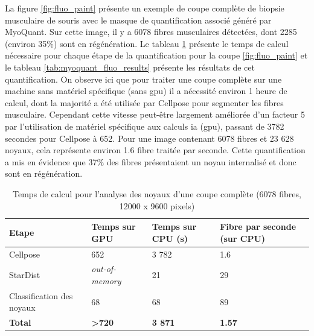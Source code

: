 La figure \ref{fig:fluo_paint} présente un exemple de coupe complète de biopsie musculaire de souris avec le masque de quantification associé généré par MyoQuant. Sur cette image, il y a 6078 fibres musculaires détectées, dont 2285 (environ 35\%) sont en régénération. Le tableau \ref{tab:myoquant_fluo_time} présente le temps de calcul nécessaire pour chaque étape de la quantification pour la coupe \ref{fig:fluo_paint} et le tableau \ref{tab:myoquant_fluo_results} présente les résultats de cet quantification. On observe ici que pour traiter  une coupe complète sur une machine sans matériel spécifique (sans \gls{gpu}) il a nécessité environ 1 heure de calcul, dont la majorité a été utilisée par Cellpose pour segmenter les fibres musculaire. Cependant cette vitesse peut-être largement améliorée d'un facteur 5 par l'utilisation de matériel spécifique aux calculs \gls{ia} (\gls{gpu}), passant de 3782 secondes pour Cellpose à 652. Pour une image contenant 6078 fibres et 23 628 noyaux, cela représente environ 1.6 fibre traitée par seconde. Cette quantification a mis en évidence que 37\% des fibres présentaient un noyau internalisé et donc sont en régénération.
\begin{table}[ht]
\centering
\caption{Temps de calcul pour l'analyse des noyaux d'une coupe complète (6078 fibres, 12000 x 9600 pixels)}
\label{tab:myoquant_fluo_time}
\begin{tabularx}{\textwidth}{|X|X|X|X|}
\hline
\textbf{Etape} & \textbf{Temps sur GPU} & \textbf{Temps sur CPU (s)} & \textbf{Fibre par seconde (sur CPU)} \\
\toprule
Cellpose & 652 & 3 782 & 1.6 \\
\hline
StarDist & \textit{out-of-memory} & 21 & 29 \\
\hline
Classification des noyaux & 68 & 68 & 89 \\
\hline
\textbf{Total} & \textbf{>720} & \textbf{3 871} & \textbf{1.57} \\
\hline
\end{tabularx}
\end{table}

